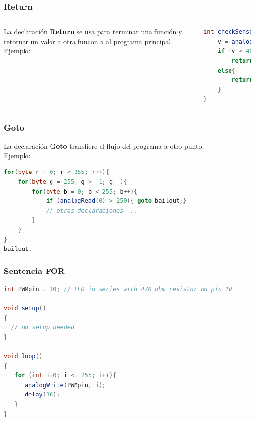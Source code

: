 \documentclass{beamer}
\begin{document}
\begin{frame}[fragile]
\frametitle{Return}
\begin{columns}[c]
La declaración \textbf{Return} se usa para terminar una función y retornar un valor a otra funcon o al programa principal.
Ejemplo:
\begin{lstlisting}[language=java]
int checkSensor(){  
	v = analogRead(0);     
    if (v > 400) {
        return 1;
    else{
        return 0;
    }
}
\end{lstlisting}
\end{columns}
\end{frame}

\begin{frame}[fragile]
\frametitle{Goto}
La declaración \textbf{Goto} transfiere el flujo del programa a otro punto.\\

\vspace{0.2in}
Ejemplo:
\begin{lstlisting}[language=java]
for(byte r = 0; r < 255; r++){
    for(byte g = 255; g > -1; g--){
        for(byte b = 0; b < 255; b++){
            if (analogRead(0) > 250){ goto bailout;}
            // otras declaraciones ... 
        }
    }
}
bailout:
\end{lstlisting}
\end{frame}



\begin{frame}[fragile]
\frametitle{Sentencia FOR}
\begin{lstlisting}[language=java]
int PWMpin = 10; // LED in series with 470 ohm resistor on pin 10

void setup()
{
  // no setup needed
}

void loop()
{
   for (int i=0; i <= 255; i++){
      analogWrite(PWMpin, i);
      delay(10);
   } 
}
\end{lstlisting}
\end{frame}

\begin{frame}[fragile]
\frametitle{}
\begin{lstlisting}[language=java]

\end{lstlisting}
\end{frame}
\end{document}
